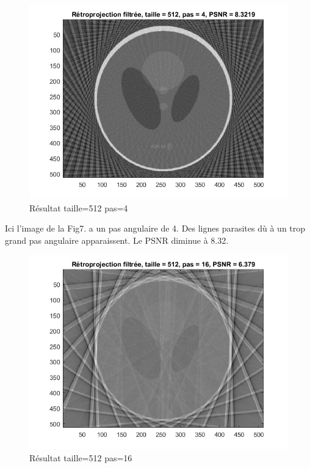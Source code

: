 \documentclass[conference]{IEEEtran}
\begin{document}
\begin{figure}[H]
\centering
\includegraphics[scale=0.5]{t512-p4}
	\caption[Résultat taille=512 pas=4]{Résultat taille=512 pas=4}
\label{fig:gallery}
\end{figure}

Ici l'image de la Fig7. a un pas angulaire de 4. Des lignes parasites dù à un trop grand pas angulaire apparaissent. Le PSNR diminue à 8.32.

\begin{figure}[H]
\centering
\includegraphics[scale=0.5]{t512-p16}
	\caption[Résultat taille=512 pas=16]{Résultat taille=512 pas=16}
\label{fig:gallery}
\end{figure}
\end{document}
